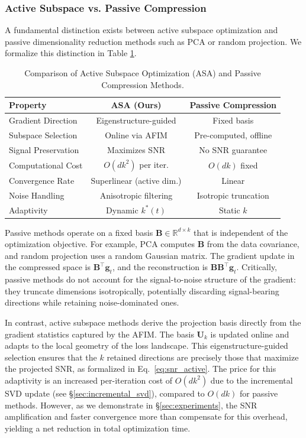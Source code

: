 ﻿\documentclass[lettersize,journal]{IEEEtran}
\begin{document}
\subsubsection{Active Subspace vs. Passive Compression}

A fundamental distinction exists between active subspace optimization and passive dimensionality reduction methods such as PCA or random projection. We formalize this distinction in Table \ref{tab:comparison}.

\begin{table}[t]
\centering
\caption{Comparison of Active Subspace Optimization (ASA) and Passive Compression Methods.}
\label{tab:comparison}
\begin{tabular}{lcc}
\toprule
\textbf{Property} & \textbf{ASA (Ours)} & \textbf{Passive Compression} \\
\midrule
Gradient Direction & Eigenstructure-guided & Fixed basis \\
Subspace Selection & Online via AFIM & Pre-computed, offline \\
Signal Preservation & Maximizes SNR & No SNR guarantee \\
Computational Cost & $O(dk^2)$ per iter. & $O(dk)$ fixed \\
Convergence Rate & Superlinear (active dim.) & Linear \\
Noise Handling & Anisotropic filtering & Isotropic truncation \\
Adaptivity & Dynamic $k^*(t)$ & Static $k$ \\
\bottomrule
\end{tabular}
\end{table}

Passive methods operate on a fixed basis $\mathbf{B} \in \mathbb{R}^{d \times k}$ that is independent of the optimization objective. For example, PCA computes $\mathbf{B}$ from the data covariance, and random projection uses a random Gaussian matrix. The gradient update in the compressed space is $\mathbf{B}^\top \mathbf{g}_t$, and the reconstruction is $\mathbf{B} \mathbf{B}^\top \mathbf{g}_t$. Critically, passive methods do not account for the signal-to-noise structure of the gradient: they truncate dimensions isotropically, potentially discarding signal-bearing directions while retaining noise-dominated ones.

In contrast, active subspace methods derive the projection basis directly from the gradient statistics captured by the AFIM. The basis $\mathbf{U}_k$ is updated online and adapts to the local geometry of the loss landscape. This eigenstructure-guided selection ensures that the $k$ retained directions are precisely those that maximize the projected SNR, as formalized in Eq.~\eqref{eq:snr_active}. The price for this adaptivity is an increased per-iteration cost of $O(dk^2)$ due to the incremental SVD update (see \S\ref{sec:incremental_svd}), compared to $O(dk)$ for passive methods. However, as we demonstrate in \S\ref{sec:experiments}, the SNR amplification and faster convergence more than compensate for this overhead, yielding a net reduction in total optimization time.
\end{document}
